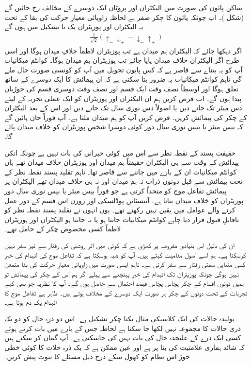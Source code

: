ساکن پائون کی صورت میں الیکٹران اور پروٹان ایک دوسرے کے مخالف رخ جائیں گے (شکل )۔ اب چونکہ پائون کا چکر صفر ہے لحاظہ زاویائی معیارِ حرکت کی بقا کے تحت یہ الیکٹران اور پوزیٹران یک تا تشکیل  میں ہوں گے
\begin{align}
	\frac{1}{\sqrt{2}}(\uparrow_{-}\downarrow_{+}-\downarrow_{-}\uparrow_{+})
\end{align}
اگر دیکھا جائے کہ الیکٹران ہم میدان ہے تب پوزیٹران لاظماً خلافِ میدان ہوگا اور اسی طرح اگر الیکٹران خلاف میدان پایا جائے تب پوزیٹران ہم میدان ہوگا۔ کوانٹم میکانیات آپ کو یہ بتناے سے قاصر ہے کہ کس پایون تحویل میں آپ کو کونسی صورت حال ملے گی تاہم کوانٹم میکانیات یہ ضرور بتا سکتی ہے کہ ان پیمائش کا ایک دوسرے کے ساتھ تعلق ہوگا اور اوسطاً نصف وقت ایک قسم اور نصف وقت دوسری قسم کی جوڑیاں پیدا ہوں گے۔ اب فرض کریں ہم ان الیکٹران اور پوزیٹران کو ایک عملی تجربہ کے لیئے دس میٹر تک جانے دیں یا اصولاً دس نوری سال تک جانے دیں اور اس کے بعد الیکٹران کے چکر کی پیمائش کریں۔ فرض کریں آپ کو ہم میدان ملتا ہے۔ آپ فوراً جان پائیں گے کہ بیس میٹر یا بیس نوری سال دور کوئی دوسرا شخص پوزیٹران کو خلاف میدان پائے گا۔

حقیقت پسند کے نقطہ نظر سے اس میں کوئی حیرانی کی بات نہیں ہے چونکہ انکی پیدائش کے وقت سے ہی الیکٹران حقیقتاً ہم میدان اور پوزیٹران خلاف میدان تھے ہاں کوانٹم میکانیات ان کے بارے میں جاننے سے قاصر تھا۔ تاہم تقلید پسند نقطہ نظر کے تحت پیمائش سے قبل دونوں ذرات نہ ہم میدان اور نہ ہی خلاف میدان تھے الیکٹران پر پیمائش تفاعل موج کو منحداً کرتی ہے جو فوراً بیس میٹر یا بیس نوری سال دور پوزیٹران کو خلاف میدان بناتا ہے۔ آئنسٹائن پوڈلسکی اور روزن اس قسم کے دور عمل کرنے والے عوامل میں یقین نہیں رکھتے تھے۔ یوں انہوں نے تقلید پسند نقطہ نظر کو ناقابلِ قبول قرار دیا چاہے کوانٹم میکانیات جانتا ہو یا نہ جانتا ہو الیکٹران اور ہوزیٹران لاظماً کسی مخصوص چکر کے حامل تھے۔

ان کی دلیل اس بنیادی مفروضہ پر کھڑی ہے کہ کوئی ھبی اثر روشنی کی رفتار سے تیز سفر نہیں کرسکتا ہے۔ ہم اسے اصول مقامیت کہتے ہیں۔ آپ کو شبہ ہوسکتا ہے کہ تفاعل موج کی انہدام کی خبر کسی متناہی سمتی رفتار سے سفر کرتی ہے۔ تاہم ایسی صورت میں زاویائی معیارِ حرکت کی بقا متمعن نہیں ہوگی چونکہ پوزیٹران تک انہدام کی خبر پہنچنے سے پہلے اگر ہم اس کے چکر کی پیمائش تو ہمیں دونوں اقسام کے چکر پچاس پچاس فیصد احتمال سے حاصل ہوں گے۔ آپ کا نظریہ جو بھی کہے تجربات کے تحت دونوں کے چکر ہر صورت ایک دوسرے کے مخلاف ہوتے ہیں۔ ظاہر ہے تفاعل موج کا انہدام یک دم ہوتا ہے۔

۔ یولیدہ حالات کی ایک کلاسیکی مثال یکتا چکر تشکیل   ہے۔ اس دو ذرہ حال کو دو یک ذری حالات کا مجموعہ نہیں لکھا جا سکتا ہے لحاظہ جس کے بارے میں بات کرتے ہوئے کسی ایک ذرے کے علیحدہ حال کی بات نہیں کی جاسکتی ہے۔ آپ گمان کر سکتے ہیں کہ شائد ہماری علامتیت کی بنا پر ہے اور عین ممکن ہے کہ یک ذرہ حلات کا کوئی خطی جوڑ اس نظام کو کھول سکے درج ذیل مسئلے کا ثبوت پیش کریں۔

